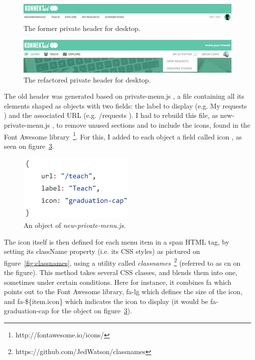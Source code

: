\begin{figure}[H]
    \centering
    \includegraphics[scale=0.3]{figure/oldNavDesktop.png}
    \caption{The former private header for desktop.}
    \label{fig:oldNavDesktop}
\end{figure}

\begin{figure}[H]
    \centering
    \includegraphics[scale=0.47]{figure/newNavDesktop.png}
    \caption{The refactored private header for desktop.}
    \label{fig:newNavDesktop}
\end{figure}

The old header was generated based on \guillemotleft{} private-menu.js \guillemotright{}, a file containing all its elements shaped as objects with two fields: the label to display (e.g. \guillemotleft{} My requests \guillemotright{}) and the associated URL (e.g. \guillemotleft{} /requests \guillemotright{}). I had to rebuild this file, as \guillemotleft{} new-private-menu.js \guillemotright{}, to remove unused sections and to include the icons, found in the Font Awesome library~\footnote{http://fontawesome.io/icons/}. For this, I added to each object a field called \guillemotleft{} icon \guillemotright{}, as seen on {\sc figure}~\ref{fig:icon}. 

\begin{figure}[H]
    \centering
    \includegraphics[scale=0.9]{figure/icon.png}
    \caption{An object of \textit{new-private-menu.js}.}
    \label{fig:icon}
\end{figure}

The icon itself is then defined for each menu item in a span HTML tag, by setting its className property (i.e. its CSS styles) as pictured on {\sc figure}~\ref{fig:classnames}, using a utility called \textit{classnames}~\footnote{https://github.com/JedWatson/classnames} (referred to as \guillemotleft{} cn \guillemotright{} on the figure). This method takes several CSS classes, and blends them into one, sometimes under certain conditions. Here for instance, it combines \guillemotleft{} fa \guillemotright{} which points out to the Font Awesome library, \guillemotleft{} fa-lg \guillemotright{} which defines the size of the icon, and \guillemotleft{} fa-\$\{item.icon\} \guillemotright{} which indicates the icon to display (it would be \guillemotleft{} fa-graduation-cap \guillemotright{} for the object on {\sc figure}~\ref{fig:icon}). 

